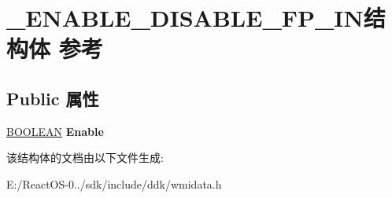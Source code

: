 \hypertarget{struct___e_n_a_b_l_e___d_i_s_a_b_l_e___f_p___i_n}{}\section{\+\_\+\+E\+N\+A\+B\+L\+E\+\_\+\+D\+I\+S\+A\+B\+L\+E\+\_\+\+F\+P\+\_\+\+I\+N结构体 参考}
\label{struct___e_n_a_b_l_e___d_i_s_a_b_l_e___f_p___i_n}
\subsection*{Public 属性}
\begin{DoxyCompactItemize}
\item 
\mbox{\label{struct___e_n_a_b_l_e___d_i_s_a_b_l_e___f_p___i_n_ab53207b6a57b5e72db7ffb642a724d51}} 
\hyperlink{_processor_bind_8h_a112e3146cb38b6ee95e64d85842e380a}{B\+O\+O\+L\+E\+AN} {\bfseries Enable}
\end{DoxyCompactItemize}


该结构体的文档由以下文件生成\+:\begin{DoxyCompactItemize}
\item 
E\+:/\+React\+O\+S-\/0../sdk/include/ddk/wmidata.\+h\end{DoxyCompactItemize}
